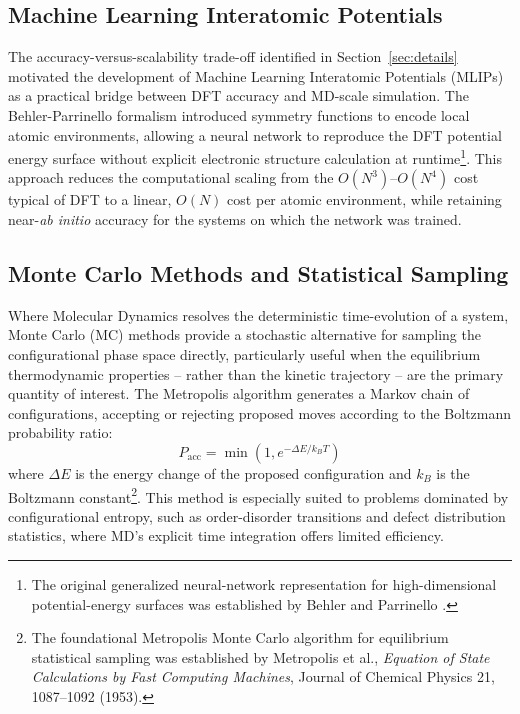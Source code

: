 \documentclass[10pt,a4paper]{article}
\begin{document}
\subsection{Machine Learning Interatomic Potentials}

The accuracy-versus-scalability trade-off identified in Section~\ref{sec:details} 
motivated the development of Machine Learning Interatomic Potentials (MLIPs) as a 
practical bridge between DFT accuracy and MD-scale simulation. The Behler-Parrinello 
formalism introduced symmetry functions to encode local atomic environments, allowing 
a neural network to reproduce the DFT potential energy surface without explicit 
electronic structure calculation at runtime\footnote{The original generalized 
neural-network representation for high-dimensional potential-energy surfaces was 
established by Behler and Parrinello \cite{behler2007}.}. This approach reduces the 
computational scaling from the $O(N^3)$--$O(N^4)$ cost typical of DFT to a linear, 
$O(N)$ cost per atomic environment, while retaining near-\textit{ab initio} accuracy 
for the systems on which the network was trained.

\subsection{Monte Carlo Methods and Statistical Sampling}

Where Molecular Dynamics resolves the deterministic time-evolution of a system, 
Monte Carlo (MC) methods provide a stochastic alternative for sampling the 
configurational phase space directly, particularly useful when the equilibrium 
thermodynamic properties -- rather than the kinetic trajectory -- are the primary 
quantity of interest. The Metropolis algorithm generates a Markov chain of 
configurations, accepting or rejecting proposed moves according to the Boltzmann 
probability ratio:
$$ P_{\text{acc}} = \min\left(1, e^{-\Delta E / k_B T}\right) $$
where $\Delta E$ is the energy change of the proposed configuration and $k_B$ is 
the Boltzmann constant\footnote{The foundational Metropolis Monte Carlo algorithm 
for equilibrium statistical sampling was established by Metropolis et al., 
\textit{Equation of State Calculations by Fast Computing Machines}, Journal of 
Chemical Physics 21, 1087--1092 (1953).}. This method is especially suited to 
problems dominated by configurational entropy, such as order-disorder transitions 
and defect distribution statistics, where MD's explicit time integration offers 
limited efficiency.
\end{document}
